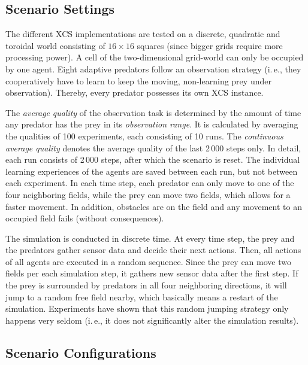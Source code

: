 \subsection{Scenario Settings}
\label{subsection:scenario-settings}

The different XCS implementations are tested %
on a discrete, quadratic and toroidal world consisting of $16 \times 16$ squares (since bigger grids require more processing power). A cell of the two-dimensional grid-world can only be occupied by one agent. 
Eight adaptive predators follow an observation strategy (i.\,e., they cooperatively have to learn to keep the moving, non-learning prey under observation). Thereby, every predator possesses its own XCS instance. 

The \emph{average} \emph{quality} of the observation task is determined by the amount of time any predator has the prey in its \emph{observation range}. It is calculated by averaging the qualities of 100 experiments, each consisting of 10 runs. The \emph{continuous average quality} denotes the average quality of the last 2\,000 steps only. In detail, each run consists of 2\,000 steps, after which the scenario is reset. The individual learning experiences of the agents are saved between each run, but not between each experiment. In each time step, each predator can only move to one of the four neighboring fields, while the prey can move two fields, which allows for a faster movement. In addition, obstacles are on the field and any movement to an occupied field fails (without consequences). 

The simulation is conducted in discrete time. At every time step, the prey and the predators gather sensor data and decide their next actions. Then, all actions of all agents are executed in a random sequence. Since the prey can move two fields per each simulation step, it gathers new sensor data after the first step. If the prey is surrounded by predators in all four neighboring directions, it will jump to a random free field nearby, which basically means a restart of the simulation. Experiments have shown that this random jumping strategy only happens very seldom (i.\,e., it does not significantly alter the simulation results).

\subsection{Scenario Configurations}
\label{subsection:scenario-obstacle}

